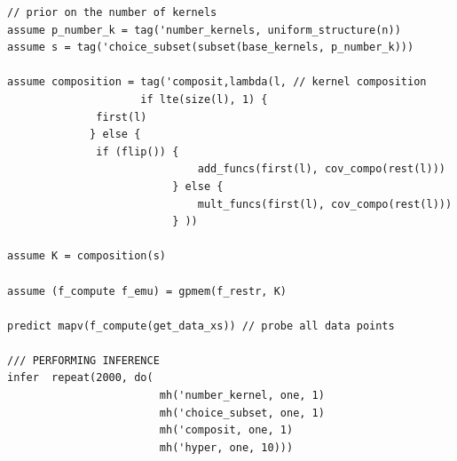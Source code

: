 \documentclass[a0,portrait]{a0poster}
\begin{document}
\begin{multicols}{3}
\begin{minipage}{\linewidth}
\begin{lstlisting}[frame=single,label=alg:structureVent,caption=Venture Code for Bayesian GP Structure Learning,mathescape]
// prior on the number of kernels
assume p_number_k = tag('number_kernels, uniform_structure(n))
assume s = tag('choice_subset(subset(base_kernels, p_number_k))) 

assume composition = tag('composit,lambda(l, // kernel composition
                     if lte(size(l), 1) {
			  first(l)
		     } else {
			  if (flip()) { 
                              add_funcs(first(l), cov_compo(rest(l)))
                          } else {
                              mult_funcs(first(l), cov_compo(rest(l)))
                          } ))
                          
assume K = composition(s)

assume (f_compute f_emu) = gpmem(f_restr, K)

predict mapv(f_compute(get_data_xs)) // probe all data points

/// PERFORMING INFERENCE  
infer  repeat(2000, do(
                        mh('number_kernel, one, 1) 
                        mh('choice_subset, one, 1) 
                        mh('composit, one, 1) 
                        mh('hyper, one, 10)))
\end{lstlisting}

\end{minipage}



 

\end{multicols}
\end{document}
